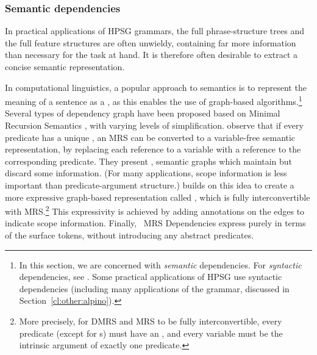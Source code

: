 \documentclass[output=paper,nonflat]{langsci/langscibook}
\begin{document}


\subsubsection{Semantic dependencies}
\label{cl:prac:dep}


In practical applications of HPSG grammars,
the full phrase-structure trees and the full feature structures are often unwieldy,
containing far more information than necessary for the task at hand.
It is therefore often desirable to extract a concise semantic representation.

In computational linguistics, a popular approach to semantics
is to represent the meaning of a sentence as a \textit{},
as this enables the use of graph-based algorithms.\footnote{%
	In this section, we are concerned with \emph{semantic} dependencies.
	For \emph{syntactic} dependencies, see .
	Some practical applications of HPSG use syntactic dependencies
	(including many applications of the  grammar, discussed in Section~\ref{cl:other:alpino}).
}
Several types of dependency graph have been proposed
based on Minimal Recursion Semantics \citep[MRS;][]{CFPS2005a},
with varying levels of simplification.
\citet{oepen2006eds} observe that if every predicate has a unique
\textit{}, an MRS can be converted to a variable-free semantic representation,
by replacing each reference to a variable with a reference to the corresponding predicate.
They present ,
semantic graphs which maintain  but discard some  information.
(For many applications, scope information is less important than predicate-argument structure.)
\citet{copestake2009dmrs} builds on this idea
to create a more expressive graph-based representation called
,
which is fully interconvertible with MRS.\footnote{%
	More precisely, for DMRS and MRS to be fully interconvertible,
	every predicate (except for s) must have an ,
	and every variable must be the intrinsic argument of exactly one predicate.
} This expressivity is achieved by adding annotations on the edges to
indicate scope information.
Finally, \delphin\ MRS Dependencies \citep[DM;][]{ivanova2012dm}
express  purely in terms of the surface tokens,
without introducing any abstract predicates.
\end{document}
